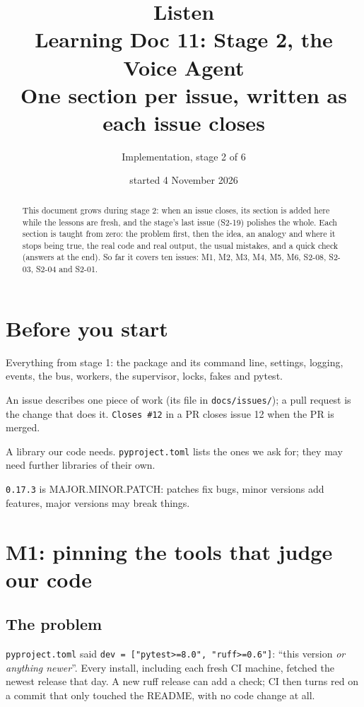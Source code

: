 \documentclass[11pt,a4paper]{article}
\title{\textbf{Listen}\\[4pt]\large Learning Doc 11: Stage 2, the Voice Agent\\
       \normalsize One section per issue, written as each issue closes}
\author{Implementation, stage 2 of 6}
\date{started 4 November 2026}
\begin{document}
\sloppy
\maketitle

\begin{abstract}
\noindent This document grows during stage 2: when an issue closes, its section is added here
while the lessons are fresh, and the stage's last issue (S2-19) polishes the whole. Each section
is taught from zero: the problem first, then the idea, an analogy and where it stops being true,
the real code and real output, the usual mistakes, and a quick check (answers at the end). So far
it covers ten issues: M1, M2, M3, M4, M5, M6, S2-08, S2-03, S2-04 and S2-01.
\end{abstract}

\tableofcontents
\newpage

\section{Before you start}
\begin{description}[style=nextline,leftmargin=1.2cm,itemsep=3pt]
  \item[Doc 10] Everything from stage 1: the package and its command line, settings, logging,
        events, the bus, workers, the supervisor, locks, fakes and pytest.
  \item[An issue and a PR] An issue describes one piece of work (its file in
        \texttt{docs/issues/}); a pull request is the change that does it. \texttt{Closes \#12} in
        a PR closes issue 12 when the PR is merged.
  \item[A dependency] A library our code needs. \texttt{pyproject.toml} lists the ones we ask
        for; they may need further libraries of their own.
  \item[A version number] \texttt{0.17.3} is MAJOR.MINOR.PATCH: patches fix bugs, minor versions
        add features, major versions may break things.
\end{description}

\section{M1: pinning the tools that judge our code}
\subsection{The problem}
\texttt{pyproject.toml} said \texttt{dev = ["pytest>=8.0", "ruff>=0.6"]}: ``this version
\emph{or anything newer}''. Every install, including each fresh CI machine, fetched the newest
release that day. A new ruff release can add a check; CI then turns red on a commit that only
touched the README, with no code change at all.
\end{document}

